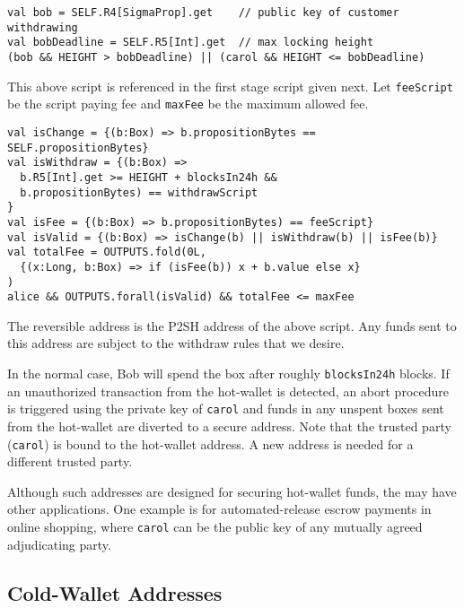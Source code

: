 \documentclass[runningheads]{llncs}
\begin{document}
\small{
\begin{verbatim}
val bob = SELF.R4[SigmaProp].get    // public key of customer withdrawing
val bobDeadline = SELF.R5[Int].get  // max locking height
(bob && HEIGHT > bobDeadline) || (carol && HEIGHT <= bobDeadline)
\end{verbatim}
}

This above script is referenced in the first stage script given next. Let \texttt{feeScript} be the script paying fee and \texttt{maxFee} be the maximum allowed fee. 

\small{
\begin{verbatim}
val isChange = {(b:Box) => b.propositionBytes == SELF.propositionBytes}
val isWithdraw = {(b:Box) => 
  b.R5[Int].get >= HEIGHT + blocksIn24h && 
  b.propositionBytes) == withdrawScript
}
val isFee = {(b:Box) => b.propositionBytes) == feeScript}
val isValid = {(b:Box) => isChange(b) || isWithdraw(b) || isFee(b)}
val totalFee = OUTPUTS.fold(0L, 
  {(x:Long, b:Box) => if (isFee(b)) x + b.value else x}
)
alice && OUTPUTS.forall(isValid) && totalFee <= maxFee
\end{verbatim}
}

The reversible address is the P2SH address of the above script. Any funds sent to this address are subject to the withdraw rules that we desire.

In the normal case, Bob will spend the box after roughly \texttt{blocksIn24h} blocks. If an unauthorized transaction from the hot-wallet is detected, an abort procedure is triggered using the private key of \texttt{carol} and funds in any unspent boxes sent from the hot-wallet are diverted to a secure address. %
Note that the trusted party (\texttt{carol}) is bound to the hot-wallet address. A new address is needed for a different trusted party. 

Although such addresses are designed for securing hot-wallet funds, the may have other applications. One example is for automated-release escrow payments in online shopping, where \texttt{carol} can be the public key of any mutually agreed adjudicating party. 

\subsection{Cold-Wallet Addresses}
\end{document}
